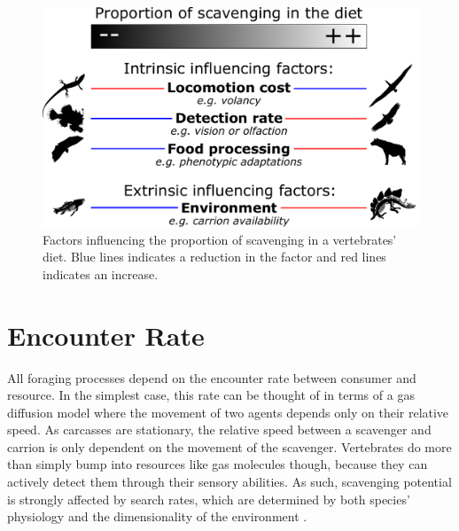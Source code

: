 \documentclass[a4paper,12pt]{article}
\begin{document}
\begin{figure}[!htbp]
\centering
   \includegraphics[width=1\textwidth]{Summary_figure/Summary_figure_Landscape.pdf}
\caption{Factors influencing the proportion of scavenging in a vertebrates' diet. Blue lines indicates a reduction in the factor and red lines indicates an increase.}
\label{Summary_figure}
\end{figure}


\section*{Encounter Rate}
All foraging processes depend on the encounter rate between consumer and resource. 
In the simplest case, this rate can be thought of in terms of a gas diffusion model where the movement of two agents depends only on their relative speed.
As carcasses are stationary, the relative speed between a scavenger and carrion is only dependent on the movement of the scavenger. 
Vertebrates do more than simply bump into resources like gas molecules though, because they can actively detect them through their sensory abilities. 
As such, scavenging potential is strongly affected by search rates, which are determined by both species' physiology and the dimensionality of the environment \citep{pawar2012dimensionality}.
\end{document}
